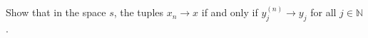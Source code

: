 Show that in the space $s$, the tuples $x_n\to x$ if and only if $y_j^{(n)}\to y_j$ for all
$j\in\mathbb{N}$.\\